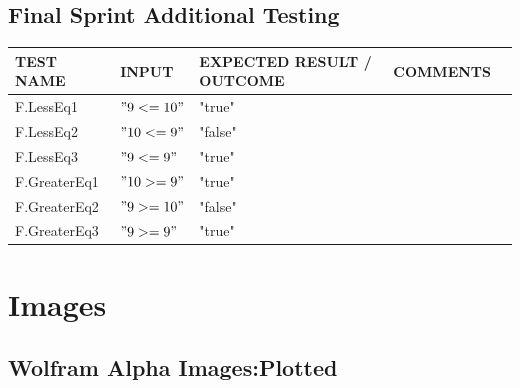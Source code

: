 \documentclass[a4paper, oneside, 11pt]{report}
\begin{document}
    \section{Final Sprint Additional Testing}
    \label{FinalTest}
    \begin{tabular}{|p{1.5in}|p{1.5in}|p{1.6in}|p{1.6in}|p{2.4in}|}
        \hline
        TEST NAME       & INPUT                     & EXPECTED RESULT / OUTCOME              & COMMENTS                                \\
        \hline
        F.LessEq1                         & $"9 <= 10"$                                & "true"        &                \\
        \hline
        F.LessEq2                         & $"10 <= 9"$                                & "false"       &                \\
        \hline
        F.LessEq3                         & $"9 <= 9"$                                 & "true"        &                \\
        \hline
        F.GreaterEq1                      & $"10 >= 9"$                                & "true"        &                \\
        \hline
        F.GreaterEq2                      & $"9 >= 10"$                                & "false"       &                \\
        \hline
        F.GreaterEq3                      & $"9 >= 9"$                                 & "true"        &                \\
        \hline
    \end{tabular}

    \chapter{Images}
    \section{Wolfram Alpha Images:Plotted} \label{WolframPlotted}
\end{document}
